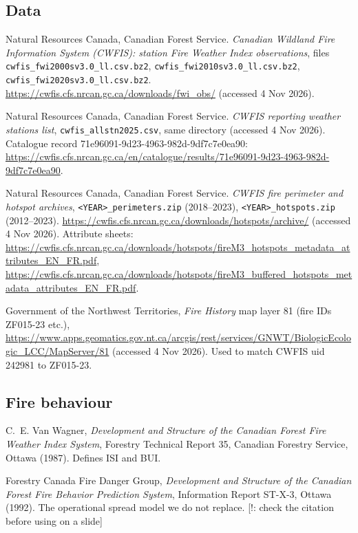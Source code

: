 \documentclass[11pt,a4paper]{article}
\newcommand{\tagbox}[2]{{\footnotesize\color{#1}\textsf{[#2]}}}
\newcommand{\caut}[1]{\tagbox{BrickRed}{!: #1}}               %
\newcommand{\code}[1]{\texttt{\small #1}}
\begin{document}
\subsection*{Data}
\begin{enumerate}[label={[D\arabic*]},leftmargin=3em]
\item Natural Resources Canada, Canadian Forest Service. \emph{Canadian Wildland Fire Information System (CWFIS):
  station Fire Weather Index observations}, files \code{cwfis\_fwi2000sv3.0\_ll.csv.bz2},
  \code{cwfis\_fwi2010sv3.0\_ll.csv.bz2}, \code{cwfis\_fwi2020sv3.0\_ll.csv.bz2}.
  \url{https://cwfis.cfs.nrcan.gc.ca/downloads/fwi_obs/} (accessed 4 Nov 2026).
\item Natural Resources Canada, Canadian Forest Service. \emph{CWFIS reporting weather stations list},
  \code{cwfis\_allstn2025.csv}, same directory (accessed 4 Nov 2026). Catalogue record
  71e96091-9d23-4963-982d-9df7c7e0ea90:
  \url{https://cwfis.cfs.nrcan.gc.ca/en/catalogue/results/71e96091-9d23-4963-982d-9df7c7e0ea90}.
\item Natural Resources Canada, Canadian Forest Service. \emph{CWFIS fire perimeter and hotspot archives},
  \code{<YEAR>\_perimeters.zip} (2018--2023), \code{<YEAR>\_hotspots.zip} (2012--2023).
  \url{https://cwfis.cfs.nrcan.gc.ca/downloads/hotspots/archive/} (accessed 4 Nov 2026). Attribute sheets:
  \url{https://cwfis.cfs.nrcan.gc.ca/downloads/hotspots/fireM3_hotspots_metadata_attributes_EN_FR.pdf},
  \url{https://cwfis.cfs.nrcan.gc.ca/downloads/hotspots/fireM3_buffered_hotspots_metadata_attributes_EN_FR.pdf}.
\item Government of the Northwest Territories, \emph{Fire History} map layer 81 (fire IDs ZF015-23 etc.),
  \url{https://www.apps.geomatics.gov.nt.ca/arcgis/rest/services/GNWT/BiologicEcologic_LCC/MapServer/81}
  (accessed 4 Nov 2026). Used to match CWFIS uid 242981 to ZF015-23.
\end{enumerate}

\subsection*{Fire behaviour}
\begin{enumerate}[label={[F\arabic*]},leftmargin=3em]
\item C.~E. Van Wagner, \emph{Development and Structure of the Canadian Forest Fire Weather Index System},
  Forestry Technical Report 35, Canadian Forestry Service, Ottawa (1987). Defines ISI and BUI.
\item Forestry Canada Fire Danger Group, \emph{Development and Structure of the Canadian Forest Fire Behavior
  Prediction System}, Information Report ST-X-3, Ottawa (1992). The operational spread model we do not replace.
  \caut{check the citation before using on a slide}
\end{enumerate}
\end{document}
